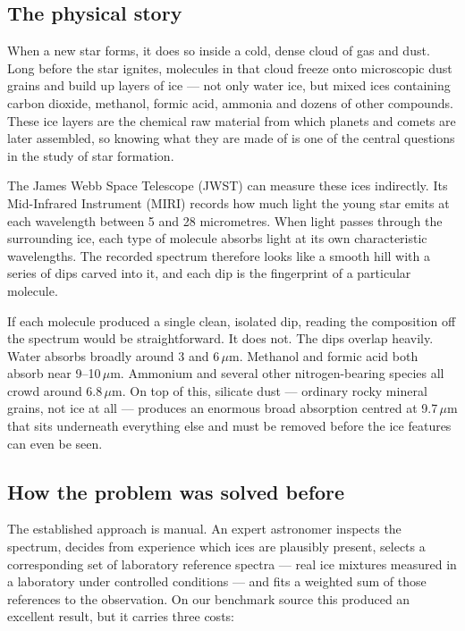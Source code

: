 \documentclass[11pt,a4paper]{article}
\newcommand{\um}{\,$\mu$m}
\begin{document}
\subsection{The physical story}

When a new star forms, it does so inside a cold, dense cloud of gas and
dust. Long before the star ignites, molecules in that cloud freeze onto
microscopic dust grains and build up layers of ice --- not only water ice,
but mixed ices containing carbon dioxide, methanol, formic acid, ammonia
and dozens of other compounds. These ice layers are the chemical raw
material from which planets and comets are later assembled, so knowing what
they are made of is one of the central questions in the study of star
formation.

The James Webb Space Telescope (JWST) can measure these ices indirectly.
Its Mid-Infrared Instrument (MIRI) records how much light the young star
emits at each wavelength between 5 and 28 micrometres. When light passes
through the surrounding ice, each type of molecule absorbs light at its own
characteristic wavelengths. The recorded spectrum therefore looks like a
smooth hill with a series of dips carved into it, and each dip is the
fingerprint of a particular molecule.

If each molecule produced a single clean, isolated dip, reading the
composition off the spectrum would be straightforward. It does not. The
dips overlap heavily. Water absorbs broadly around 3 and 6\um. Methanol and
formic acid both absorb near 9--10\um. Ammonium and several other
nitrogen-bearing species all crowd around 6.8\um. On top of this, silicate
dust --- ordinary rocky mineral grains, not ice at all --- produces an
enormous broad absorption centred at 9.7\um{} that sits underneath
everything else and must be removed before the ice features can even be
seen.

\subsection{How the problem was solved before}

The established approach is manual. An expert astronomer inspects the
spectrum, decides from experience which ices are plausibly present, selects
a corresponding set of laboratory reference spectra --- real ice mixtures
measured in a laboratory under controlled conditions --- and fits a weighted
sum of those references to the observation. On our benchmark source this
produced an excellent result, but it carries three costs:
\end{document}
